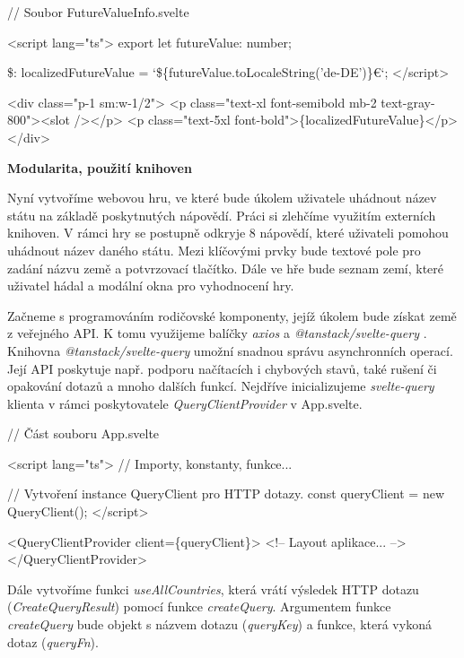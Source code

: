 \begin{prog}
// Soubor FutureValueInfo.svelte
  
<script lang="ts">
  export let futureValue: number;

  \$: localizedFutureValue = `\$\{futureValue.toLocaleString('de-DE')\}€`;
</script>

<div class="p-1 sm:w-1/2">
  <p class="text-xl font-semibold mb-2 text-gray-800"><slot /></p>
  <p class="text-5xl font-bold">\{localizedFutureValue\}</p>
</div>
\end{prog}

\begin{flushleft}
  \textbf{Modularita, použití knihoven}
\end{flushleft}

Nyní vytvoříme webovou hru, ve které bude úkolem uživatele uhádnout název státu na základě poskytnutých nápovědí. Práci si zlehčíme využitím externích knihoven. 
V rámci hry se postupně odkryje 8 nápovědí, které uživateli pomohou uhádnout název daného státu. Mezi klíčovými prvky bude textové pole pro zadání názvu země a potvrzovací tlačítko. 
Dále ve hře bude seznam zemí, které uživatel hádal a modální okna pro vyhodnocení hry.

Začneme s programováním rodičovské komponenty, jejíž úkolem bude získat země z veřejného API. K tomu využijeme balíčky \emph{axios} \cite{axiosretrylib} a \emph{@tanstack/svelte-query} \cite{tanstackquerylib}. 
Knihovna \emph{@tanstack/svelte-query} umožní snadnou správu asynchronních operací. Její API poskytuje např. podporu načítacích i chybových stavů, také rušení či opakování dotazů a mnoho dalších funkcí. 
Nejdříve inicializujeme \emph{svelte-query} klienta v rámci poskytovatele \emph{QueryClientProvider} v App.svelte.

\begin{prog}
// Část souboru App.svelte

<script lang="ts">
  // Importy, konstanty, funkce...  

  // Vytvoření instance QueryClient pro HTTP dotazy.
  const queryClient = new QueryClient();
</script>

<QueryClientProvider client=\{queryClient\}>
  <!-- Layout aplikace... -->
</QueryClientProvider>
\end{prog}

Dále vytvoříme funkci \emph{useAllCountries}, která vrátí výsledek HTTP dotazu (\emph{CreateQueryResult}) pomocí funkce \emph{createQuery}. 
Argumentem funkce \emph{createQuery} bude objekt s názvem dotazu (\emph{queryKey}) a funkce, která vykoná dotaz (\emph{queryFn}).

